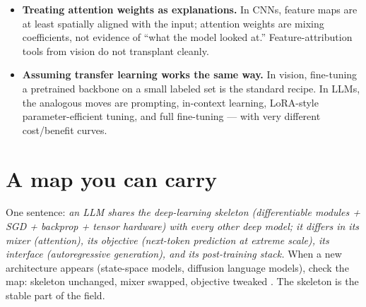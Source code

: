 \documentclass[11pt]{article}
\begin{document}
\begin{itemize}[noitemsep]
  \item \textbf{Treating attention weights as explanations.} In CNNs, feature maps are at least spatially aligned with the input; attention weights are mixing coefficients, not evidence of ``what the model looked at.'' Feature-attribution tools from vision do not transplant cleanly.
  \item \textbf{Assuming transfer learning works the same way.} In vision, fine-tuning a pretrained backbone on a small labeled set is the standard recipe. In LLMs, the analogous moves are prompting, in-context learning, LoRA-style parameter-efficient tuning, and full fine-tuning --- with very different cost/benefit curves.
\end{itemize}

\section{A map you can carry}
One sentence: \emph{an LLM shares the deep-learning skeleton (differentiable modules + SGD + backprop + tensor hardware) with every other deep model; it differs in its mixer (attention), its objective (next-token prediction at extreme scale), its interface (autoregressive generation), and its post-training stack.} When a new architecture appears (state-space models, diffusion language models), check the map: skeleton unchanged, mixer swapped, objective tweaked \cite{gu2023mamba}. The skeleton is the stable part of the field.



\end{document}
